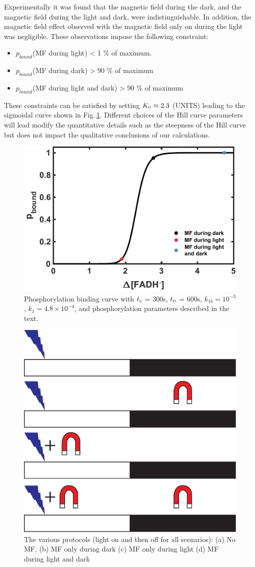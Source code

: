 \documentclass[twoside,twocolumn,9pt]{article}
\begin{document}
Experimentally it was found that the magnetic field during the dark, and the magnetic field during the light and dark, were
indistinguishable. \cite{Pooam2019} In addition, the magnetic field effect observed with the magnetic field only on during the light
was negligible. These observations impose the following constraint:
\begin{itemize}
	\item $p_{bound}$(MF during light) < 1 \% of maximum.
	\item $p_{bound}$(MF during dark) > 90 \% of maximum
	\item $p_{bound}$(MF during light and dark) > 90 \% of maximum
\end{itemize}
These constraints can be satisfied by setting $K_{\textsc{d}} \approx 2.3$ (UNITS) leading to the sigmoidal curve shown in
Fig.\,\ref{fig:sigmoid}. Different choices of the Hill curve parameters will lead modify the quantitative details such as the
steepness of the Hill curve but does not impact the qualitative conclusions of our calculations.
\begin{figure}[h]
	\centering
	\includegraphics{sigmoid.pdf}
	\caption{Phosphorylation binding curve with $t_{\textsc{l}}$ = 300s, $t_{\textsc{d}}$ = 600s, $k_{1b} = 10^{-3}$, $k_{1} = 4.8
		\times 10^{-4}$, and phosphorylation parameters described in the text.}
	\label{fig:sigmoid}
\end{figure}

\begin{figure}[h]
	\centering
	\includegraphics[width = 8.3 cm, height = 5.553 cm]{LightMfprotocol.pdf}
	\caption{The various protocols (light on and then off for all scenarios): (a) No MF, (b) MF only during dark (c) MF only during
		light (d) MF during light and dark}
	\label{fig:protocol}
\end{figure}
\end{document}
